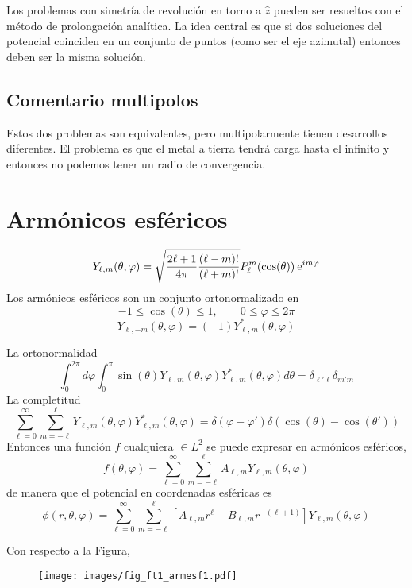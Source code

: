 \documentclass[10pt,oneside]{CBFT_book}
\begin{document}
Los problemas con simetría de revolución en torno a $\hat{z}$ pueden ser resueltos con el método de
prolongación analítica. La idea central es que si dos soluciones del potencial coinciden en un conjunto
de puntos (como ser el eje azimutal) entonces deben ser la misma solución.

\subsection{Comentario multipolos}

Estos dos problemas son equivalentes, pero multipolarmente tienen desarrollos diferentes.
El problema es que el metal a tierra tendrá carga hasta el infinito y entonces no podemos tener un
radio de convergencia.


\section{Armónicos esféricos}

\[
	Y_{\ell,m}(\theta,\varphi) = \sqrt{ \frac{ 2\ell + 1}{4\pi} \frac{(\ell-m)! }{(\ell+ m)! } }
	P_\ell^m(\cos(\theta)) \:\mathrm{e}^{i m \varphi}
\]
Los armónicos esféricos son un conjunto ortonormalizado en 
\[
	- 1 \leq \cos(\theta) \leq 1 , \qquad 0 \leq \varphi \leq 2\pi
\]
\[
	Y_{\ell,-m}(\theta,\varphi) = (-1) Y_{\ell,m}^*(\theta,\varphi)
\]

La ortonormalidad
\[
	\int_0^{2\pi} d\varphi \int_0^\pi \sin(\theta) Y_{\ell,m}(\theta,\varphi) Y_{\ell,m}^*(\theta,\varphi) d\theta 
	= \delta_{\ell'\ell}\delta_{m'm}
\]
La completitud
\[
	\sum_{\ell=0}^\infty \sum_{m=-\ell}^\ell Y_{\ell,m}(\theta,\varphi) Y_{\ell,m}^*(\theta,\varphi) = 
\delta(\varphi 	-\varphi') \delta(\cos(\theta)-\cos(\theta'))
\]
Entonces una función $f$ cualquiera $\in L^2$ se puede expresar en armónicos esféricos,
\[
	f(\theta,\varphi) = \sum_{\ell=0}^\infty \sum_{m=-\ell}^\ell A_{\ell,m} Y_{\ell,m}(\theta,\varphi)
\]
de manera que el potencial en coordenadas esféricas es
\[
	\phi(r,\theta,\varphi) = \sum_{\ell=0}^\infty \sum_{m=-\ell}^\ell [A_{\ell,m}r^\ell + B_{\ell,m} r^{-(\ell+1)}] 
	Y_{\ell,m}(\theta,\varphi)
\]

Con respecto a la Figura, 

\begin{figure}[bht]
	\begin{center}
	\texttt{[image: images/fig\_ft1\_armesf1.pdf]}	 
	\end{center}
	\caption{}
\end{figure} 
\end{document}
